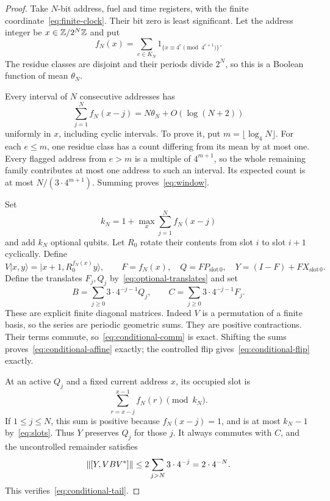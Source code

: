 \begin{proof}
Take $N$-bit address, fuel and time registers, with the finite coordinate~\eqref{eq:finite-clock}. Their bit zero is least significant. Let the address integer be $x\in\mathbb Z/2^N\mathbb Z$ and put
\begin{equation}\label{eq:mask}
 f_N(x)=\sum_{e\in K_N}1_{\{x\equiv4^e\pmod{4^{e+1}}\}}.
\end{equation}
The residue classes are disjoint and their periods divide $2^N$, so this is a Boolean function of mean $\theta_N$.

Every interval of $N$ consecutive addresses has
\begin{equation}\label{eq:window}
 \sum_{j=1}^N f_N(x-j)=N\theta_N+O(\log(N+2))
\end{equation}
uniformly in $x$, including cyclic intervals. To prove it, put $m=\lfloor\log_4N\rfloor$. For each $e\le m$, one residue class has a count differing from its mean by at most one. Every flagged address from $e>m$ is a multiple of $4^{m+1}$, so the whole remaining family contributes at most one address to such an interval. Its expected count is at most $N/(3\cdot4^{m+1})$. Summing proves~\eqref{eq:window}.

Set
\begin{equation}\label{eq:slots}
 k_N=1+\max_x\sum_{j=1}^N f_N(x-j)
\end{equation}
and add $k_N$ optional qubits. Let $R_0$ rotate their contents from slot $i$ to slot $i+1$ cyclically. Define
\begin{equation}\label{eq:finite-V}
 V|x,y\rangle=|x+1,R_0^{f_N(x)}y\rangle,
 \qquad F=f_N(x),\quad Q=F P_{\mathrm{slot}\,0},\quad
 Y=(I-F)+FX_{\mathrm{slot}\,0}.
\end{equation}
Define the translates $F_j,Q_j$ by~\eqref{eq:optional-translates} and set
\begin{equation}\label{eq:series}
 B=\sum_{j\ge0}3\cdot4^{-j-1}Q_j,\qquad
 C=\sum_{j\ge0}3\cdot4^{-j-1}F_j.
\end{equation}
These are explicit finite diagonal matrices. Indeed $V$ is a permutation of a finite basis, so the series are periodic geometric sums. They are positive contractions. Their terms commute, so~\eqref{eq:conditional-comm} is exact. Shifting the sums proves~\eqref{eq:conditional-affine} exactly; the controlled flip gives~\eqref{eq:conditional-flip} exactly.

At an active $Q_j$ and a fixed current address $x$, its occupied slot is
\[
 \sum_{r=x-j}^{x-1}f_N(r)\pmod{k_N}.
\]
If $1\le j\le N$, this sum is positive because $f_N(x-j)=1$, and is at most $k_N-1$ by~\eqref{eq:slots}. Thus $Y$ preserves $Q_j$ for those $j$. It always commutes with $C$, and the uncontrolled remainder satisfies
\begin{equation}\label{eq:tail-bound}
 \lVert[Y,VBV^*]\rVert\le2\sum_{j>N}3\cdot4^{-j}=2\cdot4^{-N}.
\end{equation}
This verifies~\eqref{eq:conditional-tail}.


\end{proof}
